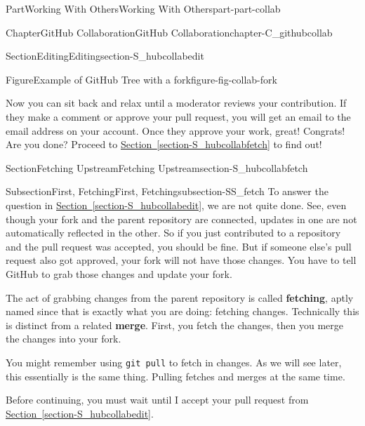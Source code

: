 \documentclass[oneside,10pt,]{book}
\newcommand{\xreffont}{\relax}
\newcommand{\mono}[1]{\texttt{#1}}
\newcommand{\terminology}[1]{\textbf{#1}}
\begin{document}
\begin{partptx}{Part}{Working With Others}{}{Working With Others}{}{}{part-part-collab}
\begin{chapterptx}{Chapter}{GitHub Collaboration}{}{GitHub Collaboration}{}{}{chapter-C_githubcollab}
\begin{sectionptx}{Section}{Editing}{}{Editing}{}{}{section-S_hubcollabedit}
\begin{figureptx}{Figure}{Example of GitHub Tree with a fork}{figure-fig-collab-fork}{}
\begin{image}{0.025}{0.95}{0.025}{}
\end{image}%
\tcblower
\end{figureptx}%
Now you can sit back and relax until a moderator reviews your contribution. If they make a comment or approve your pull request, you will get an email to the email address on your account. Once they approve your work, great! Congrats! Are you done? Proceed to \hyperref[section-S_hubcollabfetch]{Section~{\xreffont\ref{section-S_hubcollabfetch}}} to find out!%
\end{sectionptx}
%
%
\typeout{************************************************}
\typeout{************************************************}
%
\begin{sectionptx}{Section}{Fetching Upstream}{}{Fetching Upstream}{}{}{section-S_hubcollabfetch}
%
%
\typeout{************************************************}
\typeout{************************************************}
%
\begin{subsectionptx}{Subsection}{First, Fetching}{}{First, Fetching}{}{}{subsection-SS_fetch}
%
%
To answer the question in \hyperref[section-S_hubcollabedit]{Section~{\xreffont\ref{section-S_hubcollabedit}}}, we are not quite done. See, even though your fork and the parent repository are connected, updates in one are not automatically reflected in the other. So if you just contributed to a repository and the pull request was accepted, you should be fine. But if someone else's pull request also got approved, your fork will not have those changes. You have to tell GitHub to grab those changes and update your fork.%
\par
The act of grabbing changes from the parent repository is called \terminology{fetching}, aptly named since that is exactly what you are doing: fetching changes. Technically this is distinct from a related \terminology{merge}. First, you fetch the changes, then you merge the changes into your fork.%
\par
You might remember using \mono{git pull} to fetch in changes. As we will see later, this essentially is the same thing. Pulling fetches and merges at the same time.%
\par
Before continuing, you must wait until I accept your pull request from \hyperref[section-S_hubcollabedit]{Section~{\xreffont\ref{section-S_hubcollabedit}}}.%
\end{subsectionptx}
%
%
\typeout{************************************************}

\end{sectionptx}
\end{chapterptx}
\end{partptx}
\end{document}
